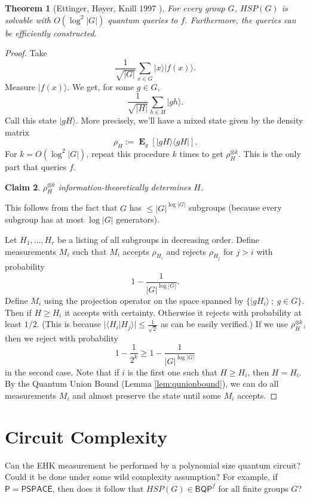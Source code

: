 \documentclass[11pt]{report}
\theoremstyle{plain}
\newtheorem{theorem}{Theorem}[section]
\newtheorem{claim}[theorem]{Claim}
\theoremstyle{definition}
\DeclareMathOperator{\Exp}{\mathbf{E}}
\renewcommand{\ket}[1]{|#1\rangle}
\newcommand{\braket}[2]{\langle#1|#2\rangle}
\newcommand{\ketbra}[2]{|#1\rangle\!\langle#2|}
\begin{document}
\begin{theorem}[Ettinger, H\o yer, Knill 1997 \cite{ehk}]
\label{ehkthm}
For every group $G$, $HSP(G)$ is solvable with $O(\log^2|G|)$ quantum queries to $f$. Furthermore, the queries can be efficiently constructed.
\end{theorem}
\begin{proof}
Take
\[
\frac 1{\sqrt{|G|}} \sum_{x\in G}\ket{x}\ket{f(x)}.
\]
Measure $\ket{f(x)}$. We get, for some $g\in G$,
\[
\frac 1{\sqrt{|H|}} \sum_{h\in H}\ket{gh} .
\]
Call this state $\ket{gH}$. More precisely, we'll have a mixed state given by the density matrix
\[
\rho_H:=\Exp_g{[\ketbra{gH}{gH}]}.
\]
For $k=O(\log^2|G|)$, repeat this procedure $k$ times to get $\rho_H^{\otimes k}$. This is the only part that queries $f$.

\begin{claim}
$\rho_H^{\otimes k}$ information-theoretically determines $H$.
\end{claim}
This follows from the fact that $G$ has $\leq |G|^{\log|G|}$ subgroups (because every subgroup has at most $\log|G|$ generators).

\bigskip
Let  $H_1,\dots,H_r$ be a listing of all subgroups in decreasing order. Define measurements $M_i$ such that $M_i$ accepts $\rho_{H_i}$ and rejects $\rho_{H_j}$ for $j>i$ with probability
\[
1-\frac{1}{|G|^{\log|G|}}.
\]
Define $M_i$ using the projection operator on the space spanned by $\{\ket{gH_i}\ ;\ g\in G\}$. Then if $H\geq H_i$ it accepts with certainty. Otherwise it rejects with probability at least $1/2$. (This is because $|\braket{H_i}{H_j}|\le \frac{1}{\sqrt{2}}$ as can be easily verified.) If we use $\rho_H^{\otimes k}$, then we reject with probability
$$1-\frac 1{2^k}\geq 1-\frac{1}{|G|^{\log|G|}}$$
in the second case. Note that if $i$ is the first one such that $H\geq H_i$, then $H=H_i$.
By the Quantum Union Bound (Lemma \ref{lem:qunionbound}), we can do all measurements $M_i$ and almost preserve the state until some $M_i$ accepts.
\end{proof}

\section{Circuit Complexity}

Can the EHK measurement be performed by a polynomial size quantum circuit? Could it be done under some wild complexity assumption? For example, if $\mathsf{P}=\mathsf{PSPACE}$, then does it follow that $HSP(G) \in \mathsf{BQP}^f$ for all finite groups $G$?
\end{document}
